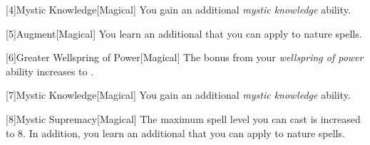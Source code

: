         [4]{Mystic Knowledge}[Magical]
        You gain an additional \textit{mystic knowledge} ability.

        [5]{Augment}[Magical]
        You learn an additional  that you can apply to nature spells.

        [6]{Greater Wellspring of Power}[Magical]
        The bonus from your \textit{wellspring of power} ability increases to .

        [7]{Mystic Knowledge}[Magical]
        You gain an additional \textit{mystic knowledge} ability.

        [8]{Mystic Supremacy}[Magical]
        The maximum spell level you can cast is increased to 8.
        In addition, you learn an additional  that you can apply to nature spells.


